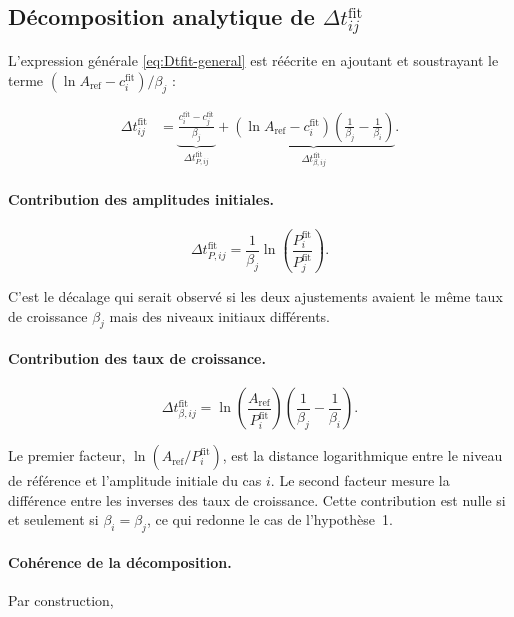 \documentclass[11pt,a4paper]{article}
\newcommand{\betai}{\beta_i}                   %
\newcommand{\Pfit}{P_i^{\mathrm{fit}}}         %
\newcommand{\cfit}{c_i^{\mathrm{fit}}}         %
\newcommand{\Aref}{A_{\mathrm{ref}}}           %
\newcommand{\Dtfit}{\Delta t_{ij}^{\mathrm{fit}}}
\newcommand{\DtPfit}{\Delta t_{P,ij}^{\mathrm{fit}}}
\newcommand{\Dtbfit}{\Delta t_{\beta,ij}^{\mathrm{fit}}}
\begin{document}
\subsection{Décomposition analytique de \texorpdfstring{$\Dtfit$}{Delta t fit}}
\label{subsec:decomp-fit}

L'expression générale \ref{eq:Dtfit-general} est réécrite en ajoutant et
soustrayant le terme \((\ln\Aref - \cfit)/\beta_j\) :

\begin{align}
    \Dtfit
    &=
    \underbrace{
        \frac{\cfit - c_j^{\mathrm{fit}}}{\beta_j}
    }_{\DtPfit}
    +
    \underbrace{
        \left(\ln\Aref - \cfit\right)
        \left(\frac{1}{\beta_j} - \frac{1}{\betai}\right)
    }_{\Dtbfit}.
    \label{eq:Dtfit-decomp}
\end{align}

\paragraph{Contribution des amplitudes initiales.}

\begin{equation}
    \DtPfit
    =
    \frac{1}{\beta_j}
    \ln\!\left(\frac{\Pfit}{P_j^{\mathrm{fit}}}\right).
    \label{eq:DtP-fit}
\end{equation}

C'est le décalage qui serait observé si les deux ajustements avaient le même
taux de croissance \(\beta_j\) mais des niveaux initiaux différents.

\paragraph{Contribution des taux de croissance.}

\begin{equation}
    \Dtbfit
    =
    \ln\!\left(\frac{\Aref}{\Pfit}\right)
    \left(\frac{1}{\beta_j} - \frac{1}{\betai}\right).
    \label{eq:Dtb-fit}
\end{equation}

Le premier facteur, \(\ln(\Aref/\Pfit)\), est la distance logarithmique entre
le niveau de référence et l'amplitude initiale du cas \(i\). Le second facteur
mesure la différence entre les inverses des taux de croissance. Cette
contribution est nulle si et seulement si \(\betai = \beta_j\), ce qui redonne
le cas de l'hypothèse~1.

\paragraph{Cohérence de la décomposition.} Par construction,
\end{document}
